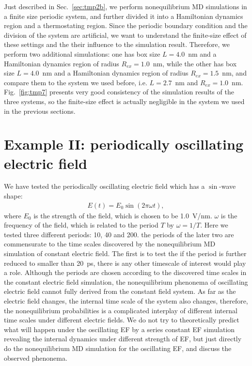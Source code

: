 \documentclass[aip,jcp,a4paper,preprint,onecolumn]{revtex4-1}
\begin{document}
Just described in Sec.~\ref{sec:tmp2b}, we perform nonequilibrium MD
simulations in a finite size periodic system, and further divided it
into a Hamiltonian dynamics region and a thermostating region.
Since the periodic boundary condition and the division of the system
are artificial, 
we want to understand the finite-size effect of
these settings and the their influence to the simulation result.
Therefore, we
perform two additional simulations: one has box size $L=4.0$~nm and a
Hamiltonian dynamics region of radius $R_{ex} = 1.0$~nm, while the
other has box size $L=4.0$~nm and a Hamiltonian dynamics region of
radius $R_{ex} = 1.5$~nm, and compare them to the system
we used before, i.e. $L=2.7$~nm and $R_{ex} = 1.0$~nm.
Fig.~\ref{fig:tmp7} presents very good consistency of
the simulation results of the three systems, so the finite-size effect is
actually negligible in the system we used in the previous sections.



\section{Example II:
  periodically oscillating electric field}

We have tested the periodically oscillating electric field which has
a $\sin$-wave shape:
\begin{align}
  E(t) = E_0\sin(2\pi \omega t),
\end{align}
where $E_0$ is the strength of the field, which is chosen to be
1.0~V/nm.  $\omega$ is the frequency of the field, which is related to
the period $T$ by $\omega = 1/T$.  Here we tested three different
periods: 10, 40 and 200.  the periods of the later two are
commensurate to the time scales discovered by the nonequilibrium MD
simulation of constant electric field. The first is to test the if the
period is further reduced to smaller than 20~ps, there is any other
timescale of interest would play a role. Although the periods are
chosen according to the discovered time scales in the constant
electric field simulation, the nonequilibrium phenonema of oscillating
electric field cannot fully derived from the constant field system.
As far as the electric field changes, the internal time scale of the
system also changes, therefore, the nonequilibrium probabilities is a
complicated interplay of different internal time scales under
different electric fields. We do not try to theoretically predict
what will happen under the oscillating EF by a series constant EF simulation
revealing the internal dynamics under different strength of EF, but just directly
do the nonequilibrium MD simulation for the oscillating EF, and discuss
the observed phenonema.
\end{document}
